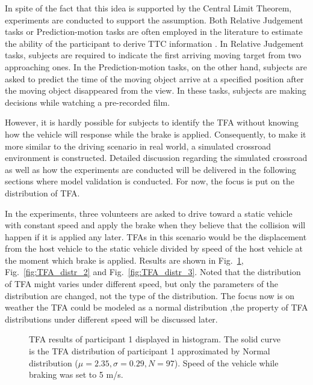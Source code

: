 In spite of the fact that this idea is supported by the Central Limit Theorem, experiments are conducted to support the assumption. Both Relative Judgement tasks or Prediction-motion tasks are often employed in the literature to estimate the ability of the participant to derive TTC information . In Relative Judgement tasks, subjects are required to indicate the first arriving moving target from two approaching ones. In the Prediction-motion tasks, on the other hand, subjects are asked to predict the time of the moving object arrive at a specified position after the moving object disappeared from the view. In these tasks, subjects are making decisions while watching a pre-recorded film. 

However, it is hardly possible for subjects to identify the TFA without knowing how the vehicle will response while the brake is applied. Consequently, to make it more similar to the driving scenario in real world, a simulated crossroad environment is constructed. Detailed discussion regarding the simulated crossroad as well as how the experiments are conducted will be delivered in the following sections where model validation is conducted. For now, the focus is put on the distribution of TFA.

In the experiments, three volunteers are asked to drive toward a static vehicle with constant speed and apply the brake when they believe that the collision will happen if it is applied any later. TFAs in this scenario would be the displacement from the host vehicle to the static vehicle divided by speed of the host vehicle at the moment which brake is applied. Results are shown in Fig.~\ref{fig:TFA_distr_1}, Fig.~\ref{fig:TFA_distr_2} and Fig.~\ref{fig:TFA_distr_3}. Noted that the distribution of TFA might varies under different speed, but only the parameters of the distribution are changed, not the type of the distribution. The focus now is on weather the TFA could be modeled as a normal distribution ,the property of TFA distributions under different speed will be discussed later. 

\begin{figure}[htbp!]
\begin{center}
\end{center}
\caption{TFA results of participant 1 displayed in histogram. The solid curve is the TFA distribution of participant 1 approximated by Normal distribution ($\mu = 2.35, \sigma = 0.29, N = 97$). Speed of the vehicle while braking was set to 5 m/s. }
\label{fig:TFA_distr_1} 
\end{figure}

